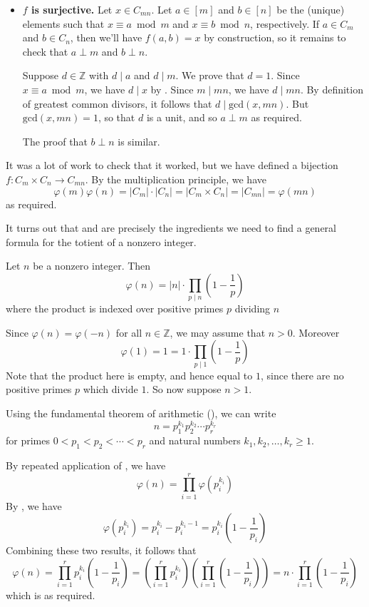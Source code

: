 \begin{cproof}
\begin{itemize}
\item \textbf{$f$ is surjective.} Let $x \in C_{mn}$. Let $a \in [m]$ and $b \in [n]$ be the (unique) elements such that $x \equiv a \bmod m$ and $x \equiv b \bmod n$, respectively. If $a \in C_m$ and $b \in C_n$, then we'll have $f(a,b)=x$ by construction, so it remains to check that $a \perp m$ and $b \perp n$.

Suppose $d \in \mathbb{Z}$ with $d \mid a$ and $d \mid m$. We prove that $d=1$. Since $x \equiv a \bmod m$, we have $d \mid x$ by . Since $m \mid mn$, we have $d \mid mn$. By definition of greatest common divisors, it follows that $d \mid \mathrm{gcd}(x,mn)$. But $\mathrm{gcd}(x,mn)=1$, so that $d$ is a unit, and so $a \perp m$ as required.

The proof that $b \perp n$ is similar.
\end{itemize}
It was a lot of work to check that it worked, but we have defined a bijection $f : C_m \times C_n \to C_{mn}$. By the multiplication principle, we have
\[ \varphi(m) \varphi(n) = |C_m| \cdot |C_n| = |C_m \times C_n| = |C_{mn}| = \varphi(mn) \]
as required.
\end{cproof}

It turns out that  and  are precisely the ingredients we need to find a general formula for the totient of a nonzero integer.

\begin{theorem}
\label{thmTotientFormula}
Let $n$ be a nonzero integer. Then
\[ \varphi(n) = |n| \cdot \prod_{p \mid n} \left( 1 - \frac{1}{p} \right) \]
where the product is indexed over positive primes $p$ dividing $n$
\end{theorem}
\begin{cproof}
Since $\varphi(n) = \varphi(-n)$ for all $n \in \mathbb{Z}$, we may assume that $n>0$. Moreover
\[ \varphi(1) = 1 = 1 \cdot \prod_{p \mid 1} \left( 1 - \frac{1}{p} \right) \]
Note that the product here is empty, and hence equal to $1$, since there are no positive primes $p$ which divide $1$. So now suppose $n>1$.

Using the fundamental theorem of arithmetic (), we can write
\[ n = p_1^{k_1}p_2^{k_2} \cdots p_r^{k_r} \]
for primes $0<p_1<p_2<\cdots<p_r$ and natural numbers $k_1,k_2,\dots,k_r \ge 1$.

By repeated application of , we have
\[ \varphi(n) = \prod_{i=1}^r \varphi(p_i^{k_i}) \]
By , we have
\[ \varphi(p_i^{k_i}) = p_i^{k_i}-p_i^{k_i-1} = p_i^{k_i} \left( 1-\frac{1}{p_i} \right) \]
Combining these two results, it follows that
\[ \varphi(n) = \prod_{i=1}^r p_i^{k_i} \left( 1 - \frac{1}{p_i} \right) = \left(\prod_{i=1}^r p_i^{k_i} \right) \left( \prod_{i=1}^r \left( 1 - \frac{1}{p_i} \right) \right) = n \cdot \prod_{i=1}^r \left( 1 - \frac{1}{p_i} \right) \]
which is as required.
\end{cproof}